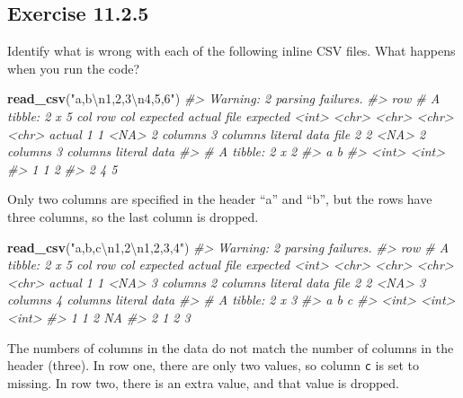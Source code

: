 \documentclass[]{book}
\newenvironment{Shaded}{\begin{snugshade}}{\end{snugshade}}
\newcommand{\CharTok}[1]{\textcolor[rgb]{0.31,0.60,0.02}{#1}}
\newcommand{\CommentTok}[1]{\textcolor[rgb]{0.56,0.35,0.01}{\textit{#1}}}
\newcommand{\KeywordTok}[1]{\textcolor[rgb]{0.13,0.29,0.53}{\textbf{#1}}}
\newcommand{\NormalTok}[1]{#1}
\newcommand{\StringTok}[1]{\textcolor[rgb]{0.31,0.60,0.02}{#1}}
\theoremstyle{plain}
\theoremstyle{remark}
\begin{document}
\hypertarget{exercise-11.2.5}{%
\subsection*{\texorpdfstring{Exercise
{11.2.5}}{Exercise 11.2.5}}\label{exercise-11.2.5}}

Identify what is wrong with each of the following inline CSV files. What
happens when you run the code?

\begin{Shaded}
\begin{Highlighting}[]
\KeywordTok{read_csv}\NormalTok{(}\StringTok{"a,b}\CharTok{\textbackslash{}n}\StringTok{1,2,3}\CharTok{\textbackslash{}n}\StringTok{4,5,6"}\NormalTok{)}
\CommentTok{#> Warning: 2 parsing failures.}
\CommentTok{#> row # A tibble: 2 x 5 col     row col   expected  actual    file         expected   <int> <chr> <chr>     <chr>     <chr>        actual 1     1 <NA>  2 columns 3 columns literal data file 2     2 <NA>  2 columns 3 columns literal data}
\CommentTok{#> # A tibble: 2 x 2}
\CommentTok{#>       a     b}
\CommentTok{#>   <int> <int>}
\CommentTok{#> 1     1     2}
\CommentTok{#> 2     4     5}
\end{Highlighting}
\end{Shaded}

Only two columns are specified in the header ``a'' and ``b'', but the
rows have three columns, so the last column is dropped.

\begin{Shaded}
\begin{Highlighting}[]
\KeywordTok{read_csv}\NormalTok{(}\StringTok{"a,b,c}\CharTok{\textbackslash{}n}\StringTok{1,2}\CharTok{\textbackslash{}n}\StringTok{1,2,3,4"}\NormalTok{)}
\CommentTok{#> Warning: 2 parsing failures.}
\CommentTok{#> row # A tibble: 2 x 5 col     row col   expected  actual    file         expected   <int> <chr> <chr>     <chr>     <chr>        actual 1     1 <NA>  3 columns 2 columns literal data file 2     2 <NA>  3 columns 4 columns literal data}
\CommentTok{#> # A tibble: 2 x 3}
\CommentTok{#>       a     b     c}
\CommentTok{#>   <int> <int> <int>}
\CommentTok{#> 1     1     2    NA}
\CommentTok{#> 2     1     2     3}
\end{Highlighting}
\end{Shaded}

The numbers of columns in the data do not match the number of columns in
the header (three). In row one, there are only two values, so column
\texttt{c} is set to missing. In row two, there is an extra value, and
that value is dropped.
\end{document}
